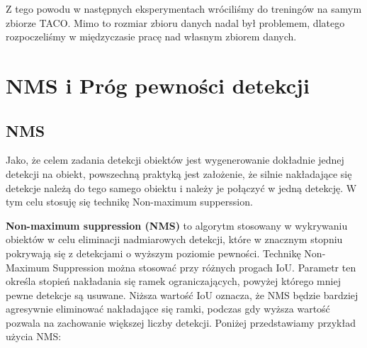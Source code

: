 \documentclass[licencjacka]{pracamgr}
\begin{document}
Z tego powodu w następnych eksperymentach wróciliśmy do treningów na samym zbiorze TACO. Mimo to rozmiar zbioru danych nadal był problemem, dlatego rozpoczeliśmy w międzyczasie pracę nad własnym zbiorem danych.

\section {NMS i Próg pewności detekcji}

\subsection{NMS}
Jako, że celem zadania detekcji obiektów jest wygenerowanie dokładnie jednej detekcji na obiekt, powszechną praktyką jest założenie, że silnie nakładające się detekcje należą do tego samego obiektu i należy je połączyć w jedną detekcję. W tym celu stosuję się technikę Non-maximum supperssion.

\textbf{Non-maximum suppression (NMS)} to algorytm stosowany w wykrywaniu obiektów w celu eliminacji nadmiarowych detekcji, które w znacznym stopniu pokrywają się z detekcjami o wyższym poziomie pewności. Technikę Non-Maximum Suppression można stosować przy różnych progach IoU. Parametr ten określa stopień nakładania się ramek ograniczających, powyżej którego mniej pewne detekcje są usuwane. Niższa wartość IoU oznacza, że NMS będzie bardziej agresywnie eliminować nakładające się ramki, podczas gdy wyższa wartość pozwala na zachowanie większej liczby detekcji.
Poniżej przedstawiamy przykład użycia NMS:
\end{document}
